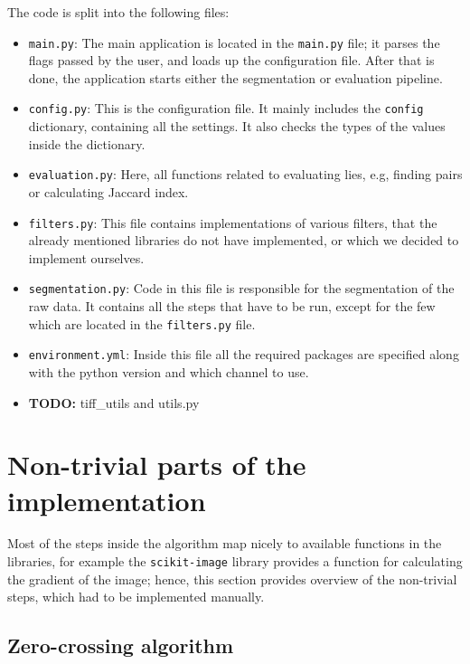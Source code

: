 \documentclass[
  digital,     %
  oneside,     %
  nosansbold,  %
  nocolorbold, %
  lof,         %
  lot,         %
]{fithesis4}
\begin{document}
The code is split into the following files: 
\begin{itemize}
    \item \texttt{main.py}: The main application is located in the
        \texttt{main.py} file; it parses the flags passed by the user, and loads
        up the configuration file. After that is done, the application starts
        either the segmentation or evaluation pipeline.
    \item \texttt{config.py}: This is the configuration file. It mainly includes
        the \texttt{config} dictionary, containing all the settings. It also
        checks the types of the values inside the dictionary.
    \item \texttt{evaluation.py}: Here, all functions related to evaluating
        lies, e.g, finding pairs or calculating Jaccard index.
    \item \texttt{filters.py}: This file contains implementations of various
        filters, that the already mentioned libraries do not have implemented,
        or which we decided to implement ourselves.
    \item \texttt{segmentation.py}: Code in this file is responsible for the
        segmentation of the raw data. It contains all the steps that have to be
        run, except for the few which are located in the \texttt{filters.py}
        file.
    \item \texttt{environment.yml}: Inside this file all the required packages
        are specified along with the python version and which channel to use.
    \item \textbf{TODO:} tiff\_utils and utils.py
\end{itemize}

\section{Non-trivial parts of the implementation}
Most of the steps inside the algorithm map nicely to available functions in the
libraries, for example the \texttt{scikit-image} library provides a function for
calculating the gradient of the image; hence, this section provides overview of
the non-trivial steps, which had to be implemented manually.

\subsection{Zero-crossing algorithm}
\end{document}

